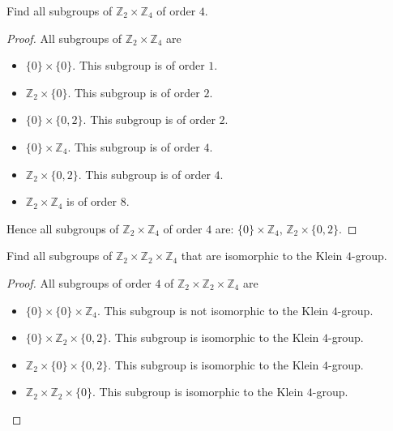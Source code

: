 \newpage
\begin{exercise}
    Find all subgroups of $\mathbb{Z}_{2}\times\mathbb{Z}_{4}$ of order $4$.
\end{exercise}

\begin{proof}
    All subgroups of $\mathbb{Z}_{2}\times\mathbb{Z}_{4}$ are
    \begin{itemize}
        \item $\{0\}\times\{0\}$. This subgroup is of order $1$.
        \item $\mathbb{Z}_{2}\times\{0\}$. This subgroup is of order $2$.
        \item $\{0\}\times\{0,2\}$. This subgroup is of order $2$.
        \item $\{0\}\times\mathbb{Z}_{4}$. This subgroup is of order $4$.
        \item $\mathbb{Z}_{2}\times\{ 0, 2 \}$. This subgroup is of order $4$.
        \item $\mathbb{Z}_{2}\times\mathbb{Z}_{4}$ is of order $8$.
    \end{itemize}

    Hence all subgroups of $\mathbb{Z}_{2}\times\mathbb{Z}_{4}$ of order $4$ are: $\{0\}\times\mathbb{Z}_{4}$, $\mathbb{Z}_{2}\times\{0,2\}$.
\end{proof}

\newpage
\begin{exercise}
    Find all subgroups of $\mathbb{Z}_{2}\times\mathbb{Z}_{2}\times\mathbb{Z}_{4}$ that are isomorphic to the Klein $4$-group.
\end{exercise}

\begin{proof}
    All subgroups of order $4$ of $\mathbb{Z}_{2}\times\mathbb{Z}_{2}\times\mathbb{Z}_{4}$ are
    \begin{itemize}
        \item $\{0\}\times\{0\}\times\mathbb{Z}_{4}$. This subgroup is not isomorphic to the Klein $4$-group.
        \item $\{0\}\times\mathbb{Z}_{2}\times\{0,2\}$. This subgroup is isomorphic to the Klein $4$-group.
        \item $\mathbb{Z}_{2}\times\{0\}\times\{0,2\}$. This subgroup is isomorphic to the Klein $4$-group.
        \item $\mathbb{Z}_{2}\times\mathbb{Z}_{2}\times\{0\}$. This subgroup is isomorphic to the Klein $4$-group.
    \end{itemize}
\end{proof}

